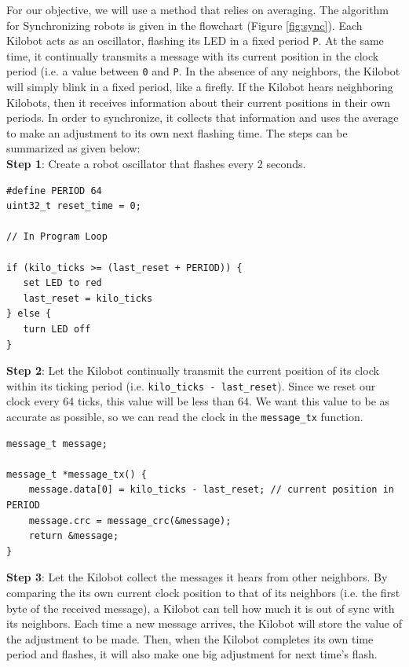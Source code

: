 \noindent For our objective, we will use a method that relies on averaging. The algorithm for Synchronizing robots is given in the flowchart (Figure \ref{fig:sync}).  Each Kilobot acts as an oscillator, flashing its LED in a fixed period \texttt{P}.  At the same time, it continually transmits a message with its current position in the clock period (i.e. a value between \texttt{0} and \texttt{P}.  In the absence of any neighbors, the Kilobot will simply blink in a fixed period, like a firefly.  If the Kilobot hears neighboring Kilobots, then it receives information about their current positions in their own periods. In order to synchronize, it collects that information and uses the average to make an adjustment to its own next flashing time. The steps can be summarized as given below: \\ 

\noindent \textbf{Step 1}: Create a robot oscillator that flashes every 2 seconds.
\begin{verbatim}
#define PERIOD 64
uint32_t reset_time = 0;

// In Program Loop

if (kilo_ticks >= (last_reset + PERIOD)) {
   set LED to red
   last_reset = kilo_ticks
} else {
   turn LED off
}
\end{verbatim}

\noindent \textbf{Step  2}: Let the Kilobot continually transmit the current position of its clock within its ticking period (i.e. \texttt{kilo\_ticks - last\_reset}). Since we reset our clock every 64 ticks, this value will be less than 64. We want this value to be as accurate as possible, so we can read the clock in the \texttt{message\_tx} function. 
\begin{verbatim}
message_t message;

message_t *message_tx() {
    message.data[0] = kilo_ticks - last_reset; // current position in PERIOD
    message.crc = message_crc(&message);
    return &message;
}
\end{verbatim}

\noindent \textbf{Step 3}: Let the Kilobot collect the messages it hears from other neighbors. 
By comparing the its own current clock position to that of its neighbors (i.e. the first byte of the received message), a Kilobot can tell how much it is out of sync with its neighbors. Each time a new message arrives, the Kilobot will store the value of the adjustment to be made. Then, when the Kilobot completes its own time period and flashes, it will also make one big adjustment for next time's flash.

